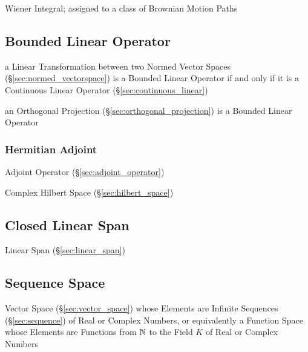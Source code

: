 Wiener Integral; assigned to a class of Brownian Motion Paths



\subsection{Bounded Linear Operator}\label{sec:bounded_linear_operator}

a Linear Transformation between two Normed Vector Spaces
(\S\ref{sec:normed_vectorspace}) is a Bounded Linear Operator if and
only if it is a Continuous Linear Operator
(\S\ref{sec:continuous_linear})

an Orthogonal Projection (\S\ref{sec:orthogonal_projection}) is a Bounded
Linear Operator



\subsubsection{Hermitian Adjoint}\label{sec:hermitian_adjoint}

Adjoint Operator (\S\ref{sec:adjoint_operator})

Complex Hilbert Space (\S\ref{sec:hilbert_space})



\subsection{Closed Linear Span}\label{sec:closed_linear_span}

Linear Span (\S\ref{sec:linear_span})



\subsection{Sequence Space}\label{sec:sequence_space}

Vector Space (\S\ref{sec:vector_space}) whose Elements are Infinite Sequences
(\S\ref{sec:sequence}) of Real or Complex Numbers, or equivalently a Function
Space whose Elements are Functions from $\mathbb{N}$ to the Field $K$ of Real or
Complex Numbers



